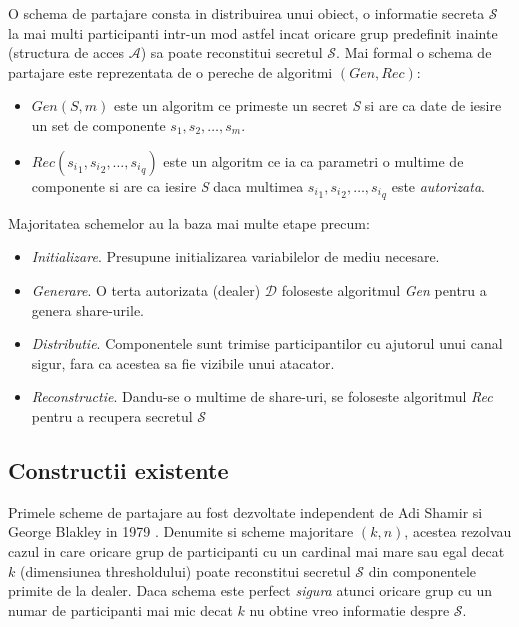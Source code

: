 \documentclass{llncs}
\begin{document}
O schema de partajare consta in distribuirea unui obiect, o informatie secreta $\mathcal{S}$ la mai multi participanti intr-un mod astfel incat oricare grup predefinit inainte (structura de acces $\mathcal{A}$) sa poate reconstitui secretul $\mathcal{S}$.
Mai formal o schema de partajare este reprezentata de o pereche de algoritmi \textbf{$(Gen, Rec)$}:
\begin{itemize}
	\item \textit{$Gen(S, m)$} este un algoritm ce primeste un secret \textit{S} si are ca date de iesire un set de componente
	${s_1, s_2, \dots, s_m}$.
	\item \textit{$Rec({s_i}_1, {s_i}_2, \dots, {s_i}_q)$} este un algoritm ce ia ca parametri o multime de componente si are ca iesire
	\textit{S} daca multimea ${{s_i}_1, {s_i}_2, \dots, {s_i}_q}$ este \textit{autorizata}. \cite{Olimid:2013}
\end{itemize} 
Majoritatea schemelor au la baza mai multe etape precum:
\begin{itemize}
	\item \textit{Initializare}. Presupune initializarea variabilelor de mediu necesare.
	\item \textit{Generare}. O terta autorizata (dealer) $\mathcal{D}$ foloseste algoritmul \textit{Gen} pentru a genera share-urile.
	\item \textit{Distributie}. Componentele sunt trimise participantilor cu ajutorul unui canal sigur, fara ca acestea sa fie vizibile unui atacator.
	\item \textit{Reconstructie}. Dandu-se o multime de share-uri, se foloseste algoritmul \textit{Rec} pentru a recupera secretul $\mathcal{S}$
\end{itemize}


\subsection{Constructii existente}
Primele scheme de partajare au fost dezvoltate independent de Adi Shamir si George Blakley in 1979 \cite{B:1979, S:1979}.
Denumite si scheme majoritare $(k, n)$, acestea rezolvau cazul in care oricare grup de participanti cu un cardinal mai mare sau egal decat $k$  (dimensiunea thresholdului) poate reconstitui secretul $\mathcal{S}$ din componentele primite de la dealer. Daca schema este perfect \textit{sigura} atunci oricare grup cu un numar de participanti mai mic decat $k$ nu obtine vreo informatie despre $\mathcal{S}$.
\end{document}
